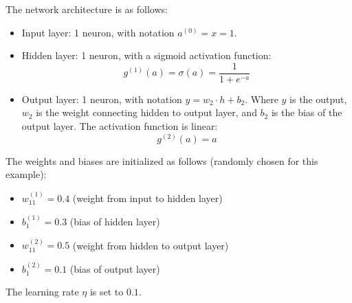 \begin{examplebox}
\begin{center}
    \end{center}
    The network architecture is as follows:
    \begin{itemize}
        \item Input layer: 1 neuron, with notation $a^{(0)} = x = 1$.
        \item Hidden layer: 1 neuron, with a sigmoid activation function:
        \begin{equation*}
            g^{(1)}(a) = \sigma(a) = \dfrac{1}{1+e^{-a}}
        \end{equation*}
        \item Output layer: 1 neuron, with notation $y = w_{2} \cdot h + b_{2}$. Where $y$ is the output, $w_{2}$ is the weight connecting hidden to output layer, and $b_{2}$ is the bias of the output layer. The activation function is linear:
        \begin{equation*}
            g^{(2)}(a) = a
        \end{equation*}
    \end{itemize}
    The weights and biases are initialized as follows (randomly chosen for this example):
    \begin{itemize}
        \item $w_{11}^{(1)} = 0.4$ (weight from input to hidden layer)
        \item $b_{1}^{(1)} = 0.3$ (bias of hidden layer)
        \item $w_{11}^{(2)} = 0.5$ (weight from hidden to output layer)
        \item $b_{1}^{(2)} = 0.1$ (bias of output layer)
    \end{itemize}
    The learning rate $\eta$ is set to $0.1$.


\end{examplebox}
